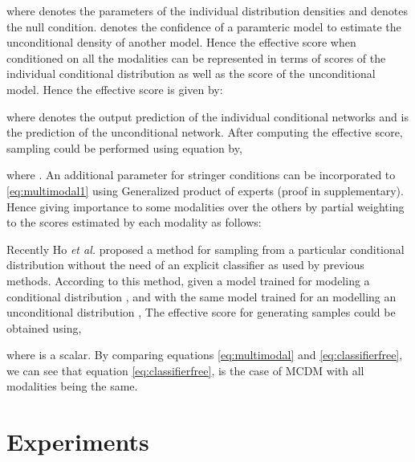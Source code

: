 \documentclass[10pt,twocolumn,letterpaper]{article}
\begin{document}
where  denotes the parameters of the individual distribution densities and  denotes the null condition.   denotes the confidence of a  paramteric model to estimate the unconditional density of another model. Hence the effective score when conditioned on all the modalities can be represented in terms of scores of the individual conditional distribution as well as the score of the unconditional model. Hence the effective score  is given by:


where  denotes the output prediction of the individual conditional networks and  is the prediction of the unconditional network. After computing the effective score, sampling could be performed using equation by,

where . An additional parameter for stringer conditions can be incorporated to  \eqref{eq:multimodal1} using Generalized product of experts \cite{cao2014generalized} (proof in supplementary). Hence giving importance to some modalities over the others by partial weighting to the scores estimated by each modality as follows:



Recently Ho \textit{et al.}\cite{ho2021classifier} proposed a method for sampling from a particular conditional distribution without the need of an explicit classifier as used by previous methods\cite{dhariwal2021diffusion}. According to this method, given a model trained for modeling a conditional distribution , and with the same model trained for an modelling an unconditional distribution , The effective score for generating samples could be obtained using,

where  is a scalar. 
By comparing equations \eqref{eq:multimodal} and \eqref{eq:classifierfree}, we can see that equation \eqref{eq:classifierfree}, is the case of MCDM with all modalities being the same. 








\section{Experiments}
\end{document}
